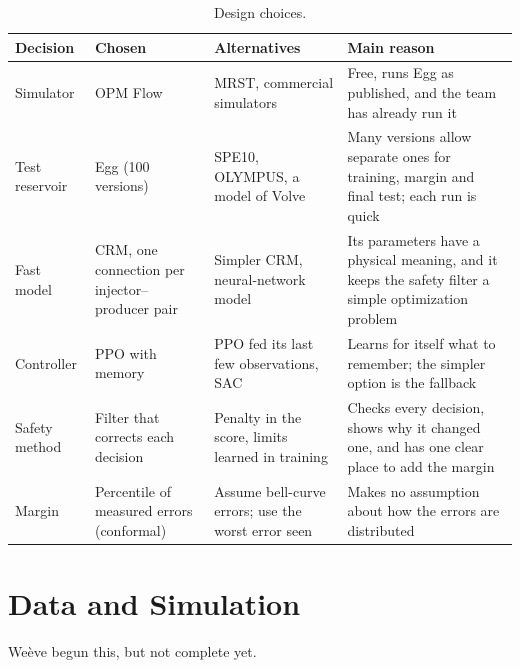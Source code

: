 \documentclass[11pt,letterpaper]{article}
\newcommand{\aur}{\textsc{Aurora}}
\begin{document}
\begin{table}[!htbp]
\caption{Design choices.}\label{tab:alt}
\small
\begin{tabularx}{\textwidth}{@{}P{2.3cm}P{2.6cm}P{3.1cm}L@{}}
\toprule
\textbf{Decision} & \textbf{Chosen} & \textbf{Alternatives} & \textbf{Main reason}\\
\midrule
Simulator & OPM Flow & MRST, commercial simulators & Free, runs Egg as published, and the team has already run it\\
Test reservoir & Egg (100 versions) & SPE10, OLYMPUS, a model of Volve & Many versions allow separate ones for training, margin and final test; each run is quick\\
Fast model & CRM, one connection per injector--producer pair & Simpler CRM, neural-network model & Its parameters have a physical meaning, and it keeps the safety filter a simple optimization problem\\
Controller & PPO with memory & PPO fed its last few observations, SAC & Learns for itself what to remember; the simpler option is the fallback\\
Safety method & Filter that corrects each decision & Penalty in the score, limits learned in training & Checks every decision, shows why it changed one, and has one clear place to add the margin\\
Margin & Percentile of measured errors (conformal) & Assume bell-curve errors; use the worst error seen & Makes no assumption about how the errors are distributed\\
\bottomrule
\end{tabularx}
\end{table}

\section{Data and Simulation}\label{sec:data}

Weève begun this, but not complete yet.
 
\end{document}
